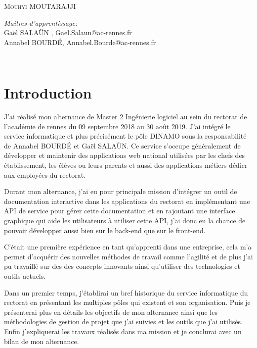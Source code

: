\documentclass[12pt]{article}
\begin{document}
\begin{titlepage}
	\centering   %
	\textsc{ Mouhyi MOUTARAJJI}\\
		\begin{flushleft} \large
		    \emph{Maîtres d'apprentissage:} \\
			Gaël SALAÜN , Gael.Salaun@ac-rennes.fr\\
			Annabel BOURDÉ, Annabel.Bourde@ac-rennes.fr
			
		\end{flushleft}
	
\end{titlepage}


\newpage

\tableofcontents
~
\newpage

\section{Introduction}

J'ai réalisé mon alternance de Master 2 Ingénierie logiciel au sein du rectorat de l'académie de rennes du 09 septembre 2018 au 30 août 2019. J'ai intégré le service informatique et plus précisément le pôle DINAMO sous la responsabilité  de Annabel BOURDÉ et Gaël SALAÜN. Ce service s'occupe généralement de développer et maintenir des applications web national utilisées par les chefs des établissement, les élèves  ou leurs parents et aussi des applications métiers dédier aux employées du rectorat.\newline

   
Durant mon alternance, j'ai eu pour principale mission d'intégrer un outil de documentation interactive dans les applications du rectorat en implémentant une API de service pour gérer cette documentation et en rajoutant une interface graphique qui aide les utilisateurs à utiliser cette API, j'ai donc eu la chance de pouvoir développer aussi bien sur le back-end que sur le front-end.\newline


C'était une première expérience en tant qu'apprenti dans une entreprise, cela m'a permet d'acquérir des nouvelles méthodes de travail comme l'agilité et de plus j'ai pu travaillé sur des des concepts innovants ainsi qu'utiliser des technologies et outils actuels.\newline


Dans un premier temps, j'établirai un bref historique du service informatique du rectorat en présentant les multiples pôles qui existent et son organisation. Puis je présenterai plus en détails les objectifs de mon alternance ainsi que les méthodologies de gestion de projet que j'ai suivies et les outils que j'ai utilisés. Enfin j'expliquerai les travaux réalisés dans ma mission et je conclurai avec un bilan de mon alternance.
\end{document}
